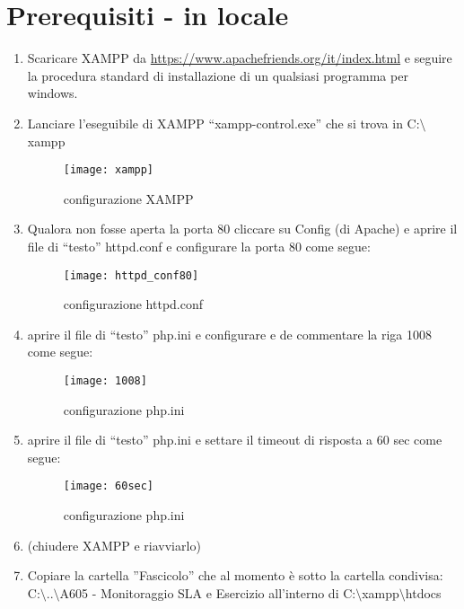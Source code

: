 \documentclass[
10pt, %
a4paper, %
oneside, %
headinclude,footinclude, %
BCOR5mm, %
]{scrartcl}
\begin{document}

\section{Prerequisiti - in locale}

\begin{enumerate}
\item Scaricare XAMPP da \url{https://www.apachefriends.org/it/index.html} e seguire la procedura standard di installazione di un qualsiasi programma per windows.
\item Lanciare l’eseguibile di XAMPP “xampp-control.exe” che si trova in C:$\setminus$xampp
\begin{figure}[h]
\centering\texttt{[image: xampp]}
\caption{configurazione XAMPP}
\end{figure}
\item Qualora non fosse aperta la porta 80 cliccare su Config (di Apache) e aprire il file di “testo” httpd.conf e configurare la porta 80 come segue:
\begin{figure}[h]
\centering\texttt{[image: httpd\_conf80]}
\caption{configurazione httpd.conf}
\end{figure}
\item aprire il file di “testo” php.ini e configurare e de commentare la riga 1008 come segue:
\begin{figure}[h]
\centering\texttt{[image: 1008]}
\caption{configurazione php.ini}
\end{figure}
\item aprire il file di “testo” php.ini e settare il timeout di risposta a 60 sec come segue:
\begin{figure}[h]
\centering\texttt{[image: 60sec]}
\caption{configurazione php.ini}
\end{figure}
\item (chiudere XAMPP e riavviarlo)
\item Copiare la cartella ”Fascicolo” che al momento è sotto la cartella condivisa:\\
C:$\setminus$..$\setminus$A605 - Monitoraggio SLA e Esercizio all'interno di C:$\setminus$xampp$\setminus$htdocs
\end{enumerate}
\end{document}
